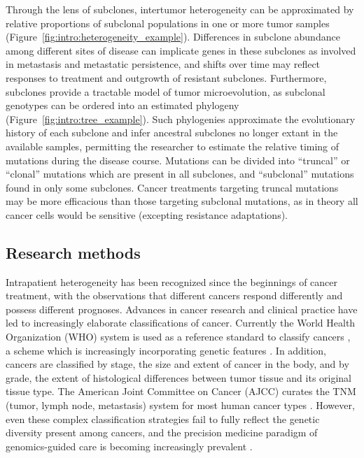 Through the lens of subclones, intertumor heterogeneity can be approximated by relative proportions of subclonal populations in one or more tumor samples (Figure~\ref{fig:intro:heterogeneity_example}). Differences in subclone abundance among different sites of disease can implicate genes in these subclones as involved in metastasis and metastatic persistence, and shifts over time may reflect responses to treatment and outgrowth of resistant subclones. Furthermore, subclones provide a tractable model of tumor microevolution, as subclonal genotypes can be ordered into an estimated phylogeny (Figure~\ref{fig:intro:tree_example}). Such phylogenies approximate the evolutionary history of each subclone and infer ancestral subclones no longer extant in the available samples, permitting the researcher to estimate the relative timing of mutations during the disease course. Mutations can be divided into ``truncal'' or ``clonal'' mutations which are present in all subclones, and ``subclonal'' mutations found in only some subclones. Cancer treatments targeting truncal mutations may be more efficacious than those targeting subclonal mutations, as in theory all cancer cells would be sensitive (excepting resistance adaptations).

\subsection{Research methods}
\label{ssec:intro:heterogeneity_methods}
Intrapatient heterogeneity has been recognized since the beginnings of cancer treatment, with the observations that different cancers respond differently and possess different prognoses. Advances in cancer research and clinical practice have led to increasingly elaborate classifications of cancer. Currently the World Health Organization (WHO) system is used as a reference standard to classify cancers \cite{who_cancer_classification_1_5,who_cancer_classification_2_5,who_cancer_classification_3_5,who_cancer_classification_4_5}, a scheme which is increasingly incorporating genetic features \cite{carbone2020}. In addition, cancers are classified by stage, the size and extent of cancer in the body, and by grade, the extent of histological differences between tumor tissue and its original tissue type. The American Joint Committee on Cancer (AJCC) curates the TNM (tumor, lymph node, metastasis) system for most human cancer types \cite{amin2017}. However, even these complex classification strategies fail to fully reflect the genetic diversity present among cancers, and the precision medicine paradigm of genomics-guided care is becoming increasingly prevalent \cite{johnson2017}.

